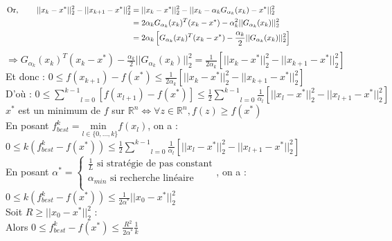 \documentclass[12pt,a4paper]{article}
\begin{document}
\begin{align*}
    \text{Or, } \qquad ||x_k - x^*||_2^2 - ||x_{k+1} - x^*||_2^2 &= ||x_k - x^*||_2^2 - ||x_k - \alpha_k G_{\alpha_k}(x_k) - x^*||_2^2 \hspace{14.5cm}\\
    &= 2 \alpha_k G_{\alpha_k}(x_k)^T (x_k - x^*) - \alpha_k^2 ||G_{\alpha_k}(x_k)||_2^2\\
    &= 2 \alpha_k \left[ G_{\alpha_k}(x_k)^T (x_k - x^*) - \frac{\alpha_k}{2} ||G_{\alpha_k}(x_k)||_2^2 \right]
\end{align*}
$\Rightarrow G_{\alpha_k}(x_k)^T (x_k - x^*) - \frac{\alpha_k}{2} ||G_{\alpha_k}(x_k)||_2^2 = \frac{1}{2 \alpha_k} \left[ ||x_k - x^*||_2^2 - ||x_{k+1} - x^*||_2^2 \right]$\\

Et donc : $0 \leq f(x_{k+1}) - f(x^*) \leq \frac{1}{2 \alpha_k} \left[ ||x_k - x^*||_2^2 - ||x_{k+1} - x^*||_2^2 \right]$\\

D'où : $0 \leq \underset{l = 0}{\overset{k-1}{\sum}}\left[ f(x_{l+1}) - f(x^*) \right] \leq \frac{1}{2} \underset{l = 0}{\overset{k-1}{\sum}} \frac{1}{\alpha_l} \left[ ||x_l - x^*||_2^2 - ||x_{l+1} - x^*||_2^2 \right]$\\
$x^*$ est un minimum de $f$ sur $\mathbb{R}^n \Leftrightarrow \forall z \in \mathbb{R}^n, f(z) \geq f(x^*)$\\


En posant $f_{best}^k = \underset{l \in \{0, \dots, k\}}{\text{min }} f(x_l)$, on a :\\
$0 \leq k(f_{best}^k - f(x^*)) \leq \frac{1}{2} \underset{l = 0}{\overset{k-1}{\sum}} \frac{1}{\alpha_l} \left[ ||x_l - x^*||_2^2 - ||x_{l+1} - x^*||_2^2 \right]$\\

En posant $\alpha^* = \begin{cases}
    \frac{1}{L} \text{ si stratégie de pas constant}\\
    \alpha_{min} \text{ si recherche linéaire}\\
\end{cases}$, on a :\\

$0 \leq k(f_{best}^k - f(x^*)) \leq \frac{1}{2 \alpha^*} ||x_0 - x^*||_2^2$\\

Soit $R \geq ||x_0 - x^*||_2^2$ :\\
Alors $0 \leq f_{best}^k - f(x^*) \leq \frac{R^2}{2 \alpha^*} \frac{1}{k}$\\
\end{document}
